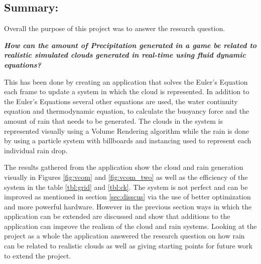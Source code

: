 \subsection{Summary:}
\label{sec:sum}

Overall the purpose of this project was to answer the research question. 

\textit{\textbf{How can the amount of Precipitation generated in a game be related to realistic simulated clouds generated in real-time using fluid dynamic equations?}}

This has been done by creating an application that solves the Euler's Equation each frame to update a system in which the cloud is represented.
In addition to the Euler's Equations several other equations are used, the water continuity equation and thermodynamic equation, to calculate the buoyancy force and the amount of rain that needs to be generated.
The clouds in the system is represented visually using a Volume Rendering algorithm while the rain is done by using a particle system with billboards and instancing used to represent each individual rain drop.

The results gathered from the application show the cloud and rain generation visually in Figures \ref{fig:vcom} and \ref{fig:vcom_two} as well as the efficiency of the system in the table \ref{tbl:grid} and \ref{tbl:ck}.
The system is not perfect and can be improved as mentioned in section \ref{sec:disscus} via the use of better optimization and more powerful hardware.
However in the previous section ways in which the application can be extended are discussed and show that additions to the application can improve the realism of the cloud and rain systems. 
Looking at the project as a whole the application answered the research question on how rain can be related to realistic clouds as well as giving starting points for future work to extend the project.